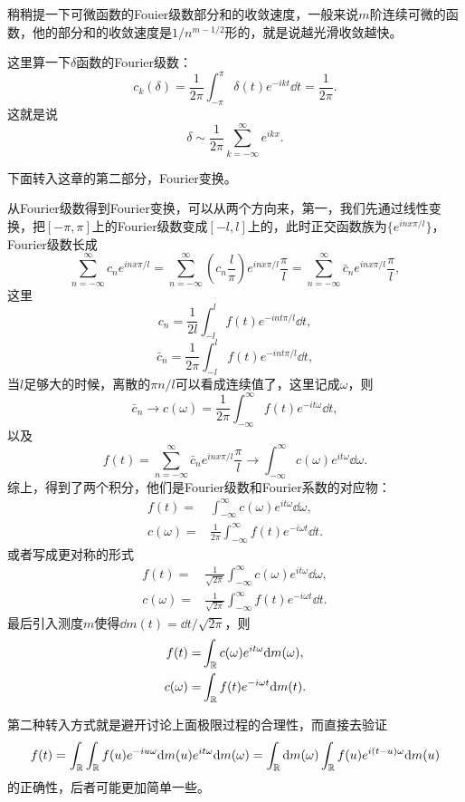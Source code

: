 \documentclass[10pt]{book}
\theoremstyle{plain}%
\begin{document}
稍稍提一下可微函数的Fouier级数部分和的收敛速度，一般来说$m$阶连续可微的函数，他的部分和的收敛速度是$1/n^{m-1/2}$形的，就是说越光滑收敛越快。

这里算一下$\delta$函数的Fourier级数：
\[
	c_k(\delta)=\frac{1}{2\pi}\int_{-\pi}^\pi\delta(t)e^{-ikt}\dd t=\frac{1}{2\pi}.
\]
这就是说
\[
	\delta\sim \frac{1}{2\pi}\sum_{k=-\infty}^\infty e^{ikx}.
\]

下面转入这章的第二部分，Fourier变换。

从Fourier级数得到Fourier变换，可以从两个方向来，第一，我们先通过线性变换，把$[-\pi,\pi]$上的Fourier级数变成$[-l,l]$上的，此时正交函数族为$\{e^{inx\pi/l}\}$，Fourier级数长成
\[
	\sum_{n=-\infty}^\infty c_ne^{inx\pi/l}=\sum_{n=-\infty}^\infty \left(c_n\frac{l}{\pi}\right)e^{inx\pi/l}\frac{\pi}{l}=\sum_{n=-\infty}^\infty \bar{c}_ne^{inx\pi/l}\frac{\pi}{l},
\]
这里
\[
	c_n=\frac{1}{2l}\int_{-l}^l f(t)e^{-int\pi/l}\dd t,
\]
\[
	\bar{c}_n=\frac{1}{2\pi}\int_{-l}^l f(t)e^{-int\pi/l}\dd t,
\]
当$l$足够大的时候，离散的$\pi n/l$可以看成连续值了，这里记成$\omega$，则
\[
	\bar{c}_n\to c(\omega)=\frac{1}{2\pi}\int_{-\infty}^\infty f(t)e^{-it\omega}\dd t,
\]
以及
\[
	f(t)=\sum_{n=-\infty}^\infty \bar{c}_ne^{inx\pi/l}\frac{\pi}{l}
	\to \int_{-\infty}^\infty c(\omega)e^{it\omega}\dd \omega.
\]
综上，得到了两个积分，他们是Fourier级数和Fourier系数的对应物：
\[
\begin{split}
	f(t)=&\int_{-\infty}^\infty c(\omega)e^{it\omega}\dd \omega,\\
	c(\omega)=&\frac{1}{2\pi}\int_{-\infty}^\infty f(t)e^{-i\omega t}\dd t.
\end{split}
\]
或者写成更对称的形式
\begin{equation}
\label{fouriertran}
\begin{split}
	f(t)=&\frac{1}{\sqrt{2\pi}}\int_{-\infty}^\infty c(\omega)e^{it\omega}\dd \omega,\\
	c(\omega)=&\frac{1}{\sqrt{2\pi}}\int_{-\infty}^\infty f(t)e^{-i\omega t}\dd t.
\end{split}
\end{equation}
最后引入测度$m$使得$\dd m(t)=\dd t/\sqrt{2\pi}$，则
\[
\begin{split}
	f(t)=&\int_{\mathbb{R}} c(\omega)e^{it\omega}\mathrm{d} m(\omega),\\
	c(\omega)=&\int_{\mathbb{R}} f(t)e^{-i\omega t}\mathrm{d} m(t).
\end{split}
\]

第二种转入方式就是避开讨论上面极限过程的合理性，而直接去验证
\[
	f(t)=\int_{\mathbb{R}} \int_{\mathbb{R}} f(u)e^{-iu\omega}\mathrm{d} m(u)e^{it\omega}\mathrm{d} m(\omega)=\int_{\mathbb{R}} \mathrm{d} m(\omega) \int_{\mathbb{R}} f(u)e^{i(t-u)\omega}\mathrm{d} m(u)
\]
的正确性，后者可能更加简单一些。
\end{document}
